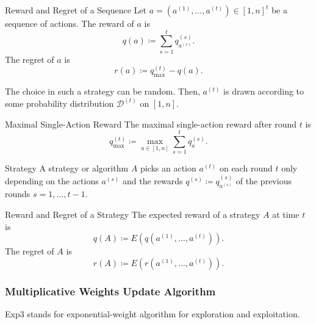 \documentclass[english]{panikzettel}
\begin{document}
\begin{halfboxl}
\vspace{-\baselineskip}
\begin{defi}{Reward and Regret of a Sequence}
Let $a=(a^{(1)},...,a^{(t)})\in [1,n]^t$ be a sequence of actions. The reward of $a$ is
\[
q(a)\coloneqq \sum_{s=1}^t q_{a^{(s)}}^{(s)}.
\]
The regret of $a$ is
\[
r(a)\coloneqq q_{\max}^{(t)} -q(a).
\]
\end{defi}
The choice in such a strategy can be random. Then, $a^{(t)}$ is drawn according to some probability distribution $\mathcal{D}^{(t)}$ on $[1,n]$.
\end{halfboxl}
\begin{halfboxr}
\vspace{-\baselineskip}
\begin{defi}{Maximal Single-Action Reward}
The maximal single-action reward after round $t$ is
\[
q_{\max}^{(t)}\coloneqq \max_{a\in[1,n]} \sum_{s=1}^t q_{a}^{(s)}.
\]
\end{defi}

\begin{defi}{Strategy}
A strategy or algorithm $A$ picks an action $a^{(t)}$ on each round $t$ only depending on the actions $a^{(s)}$ and the rewards $q^{(s)}\coloneqq q_{a^{(s)}}^{(s)}$ of the previous rounds $s=1,...,t-1$.
\end{defi}
\end{halfboxr}



\begin{defi}{Reward and Regret of a Strategy}
The expected reward of a strategy $A$ at time $t$ is
\[
q(A)\coloneqq E(q(a^{(1)},...,a^{(t)})).
\]
The regret of $A$ is
\[
r(A)\coloneqq E(r(a^{(1)},...,a^{(t)})).
\]
\end{defi}

\subsubsection{Multiplicative Weights Update Algorithm}
Exp3 stands for exponential-weight algorithm for exploration and exploitation.
\end{document}
